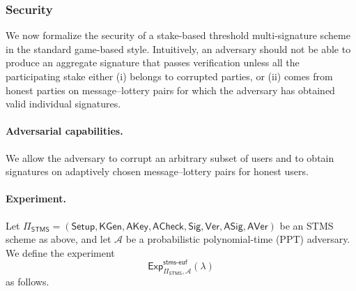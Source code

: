 \documentclass{article}
\begin{document}
\subsubsection{Security}

We now formalize the security of a stake-based threshold multi-signature
scheme in the standard game-based style.  Intuitively, an adversary should
not be able to produce an aggregate signature that passes verification
unless all the participating stake either (i) belongs to corrupted parties,
or (ii) comes from honest parties on message--lottery pairs for which the
adversary has obtained valid individual signatures.

\paragraph{Adversarial capabilities.}
We allow the adversary to corrupt an arbitrary subset of users and to obtain
signatures on adaptively chosen message--lottery pairs for honest users.

\paragraph{Experiment.}
Let 
$
  \Pi_{\mathsf{STMS}}
  =
  (\mathsf{Setup}, \mathsf{KGen}, \mathsf{AKey}, \mathsf{ACheck},
   \mathsf{Sig}, \mathsf{Ver}, \mathsf{ASig}, \mathsf{AVer})
$
be an STMS scheme as above, and let $\mathcal{A}$ be a probabilistic
polynomial-time (PPT) adversary.
We define the experiment
\[
  \mathsf{Exp}^{\mathsf{stms\mbox{-}euf}}_{\Pi_{\mathsf{STMS}},\mathcal{A}}(\lambda)
\]
as follows.
\end{document}
